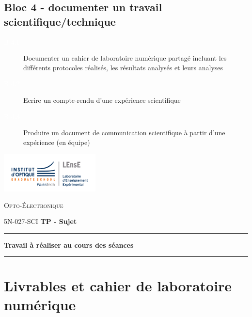 \documentclass[a4paper,11pt,twoside]{book} %
\begin{document}
{\subsection{Bloc 4 - documenter un travail scientifique/technique}

\begin{description}
	\item[\colorbox{violet_iogs!70}{\textcolor{white}{B 4.1}}] Documenter un cahier de laboratoire numérique partagé incluant les différents protocoles réalisés, les résultats analysés et leurs analyses
	\item[\colorbox{violet_iogs!70}{\textcolor{white}{B 4.2}}] Ecrire un compte-rendu d'une expérience scientifique
	\item[\colorbox{violet_iogs!70}{\textcolor{white}{B 4.3}}] Produire un document de communication scientifique à partir d'une expérience (en équipe)
\end{description}


\newpage


\begin{minipage}[c]{.25\linewidth}
	\includegraphics[width=5cm]{images/Logo-LEnsE.png}
\end{minipage} \hfill
\begin{minipage}[c]{.4\linewidth}

\begin{center}
\vspace{0.3cm}
{\Large \textsc{Opto-Électronique}}

\medskip

5N-027-SCI \qquad \textbf{\Large TP - Sujet}

\end{center}
\end{minipage}\hfill

\vspace{0.5cm}

\noindent \rule{\linewidth}{1pt}

{\noindent\Large  \rule[-7pt]{0pt}{30pt}
 \textbf{Travail à réaliser au cours des séances}}

\noindent \rule{\linewidth}{1pt}


\section{Livrables et cahier de laboratoire numérique}

}
\end{document}
